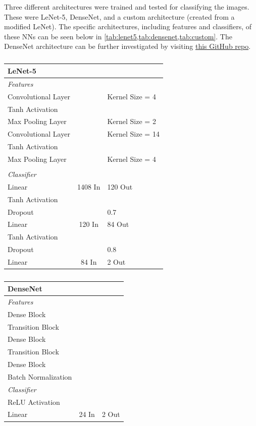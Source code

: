 \documentclass[manuscript,screen,review]{acmart}
\begin{document}
Three different architectures were trained and tested for classifying the images. These were LeNet-5, DenseNet, and a custom architecture (created from a modified LeNet). The specific architectures, including features and classifiers, of these NNs can be seen below in \cref{tab:lenet5,tab:densenet,tab:custom}. The DenseNet architecture can be further investigated by visiting \href{https://github.com/andreasveit/densenet-pytorch}{this GitHub repo}. 


\begin{table}[h!]
  \caption{}
  \label{tab:lenet5}
  \begin{tabular}{lcl}
    \textbf{LeNet-5} \\
    \toprule
    \textit{Features} \\
    \midrule
    Convolutional Layer &  & Kernel Size = 4 \\
    Tanh Activation & & \\
    Max Pooling Layer & & Kernel Size = 2\\
    Convolutional Layer &  & Kernel Size = 14 \\
    Tanh Activation & & \\
    Max Pooling Layer & & Kernel Size = 4\\
     & & \\
    \textit{Classifier} \\
    \midrule
    Linear & 1408 In & 120 Out\\
    Tanh Activation & & \\
    Dropout & & 0.7 \\
    Linear & 120 In & 84 Out\\
    Tanh Activation & & \\
    Dropout & & 0.8 \\
    Linear & 84 In & 2 Out\\
  \bottomrule
\end{tabular}
\end{table}


\begin{table}[h!]
\caption{}
  \label{tab:densenet}
  \begin{tabular}{lcl}
    \textbf{DenseNet} \\
    \toprule
    \textit{Features} \\
    \midrule
    Dense Block &  &  \\
    Transition Block & & \\
    Dense Block &  &  \\
    Transition Block & & \\
    Dense Block &  &  \\
    Batch Normalization & & \\
    \textit{Classifier} \\
    \midrule
    ReLU Activation &  & \\
    Linear & 24 In & 2 Out\\
    \bottomrule
\end{tabular}
\end{table}
\end{document}
